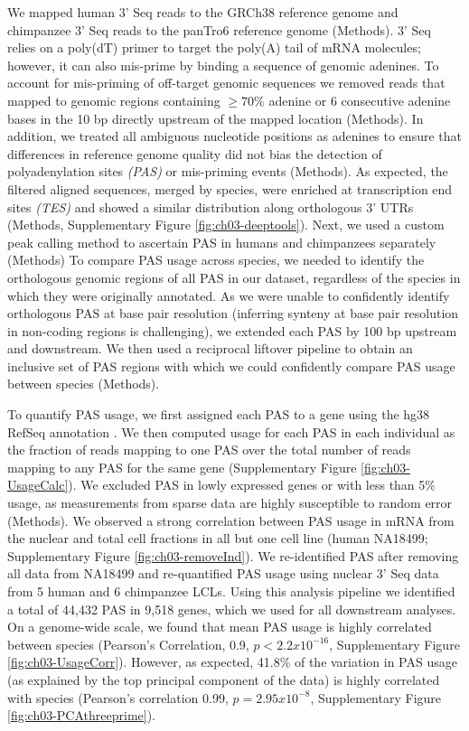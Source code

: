 We mapped human 3' Seq reads to the GRCh38 reference genome and chimpanzee 3' Seq reads to the panTro6 reference genome \citep{chimpanzee_sequencing_and_analysis_consortium_initial_2005, schneider_evaluation_2017}  (Methods). 3' Seq relies on a poly(dT) primer to target the poly(A) tail of mRNA molecules; however, it can also mis-prime by binding a sequence of genomic adenines. To account for mis-priming of off-target genomic sequences we removed reads that mapped to genomic regions containing $\geq70\%$ adenine or 6 consecutive adenine bases in the 10 bp directly upstream of the mapped location  \citep{mittleman_alternative_2020, sheppard_accurate_2013, tian_large-scale_2005} (Methods). In addition, we treated all ambiguous nucleotide positions as adenines to ensure that differences in reference genome quality did not bias the detection of polyadenylation sites \emph{(PAS)} or mis-priming events (Methods). As expected, the filtered aligned sequences, merged by species, were enriched at transcription end sites \emph{(TES)} and showed a similar distribution along orthologous 3' UTRs (Methods, Supplementary Figure \ref{fig:ch03-deeptools}). Next, we used a custom peak calling method to ascertain PAS in humans and chimpanzees separately (Methods) To compare PAS usage across species, we needed to identify the orthologous genomic regions of all PAS in our dataset, regardless of the species in which they were originally annotated. As we were unable to confidently identify orthologous PAS at base pair resolution (inferring synteny at base pair resolution in non-coding regions is challenging\citep{broad_institute_sequencing_platform_and_whole_genome_assembly_team_high-resolution_2011}),  we extended each PAS by 100 bp upstream and downstream. We then used a reciprocal liftover pipeline to obtain an inclusive set of PAS regions with which we could confidently compare PAS usage between species (Methods). 


To quantify PAS usage, we first assigned each PAS to a gene using the hg38 RefSeq annotation \citep{pruitt_ncbi_2005}. We then computed usage for each PAS in each individual as the fraction of reads mapping to one PAS over the total number of reads mapping to any PAS for the same gene (Supplementary Figure \ref{fig:ch03-UsageCalc}). We excluded PAS in lowly expressed genes or with less than 5\% usage, as measurements from sparse data are highly susceptible to random error (Methods). We observed a strong correlation between PAS usage in mRNA from the nuclear and total cell fractions in all but one cell line (human NA18499; Supplementary Figure \ref{fig:ch03-removeInd}). We re-identified PAS after removing all data from NA18499 and re-quantified PAS usage using nuclear 3' Seq data from 5 human and 6 chimpanzee LCLs. Using this analysis pipeline we identified a total of 44,432 PAS in 9,518 genes, which we used for all downstream analyses. On a genome-wide scale, we found that mean PAS usage is highly correlated between species (Pearson's Correlation, 0.9, $p<2.2x10^{-16}$, Supplementary Figure \ref{fig:ch03-UsageCorr}). However, as expected, 41.8\% of the variation in PAS usage (as explained by the top principal component of the data) is highly correlated with species (Pearson's correlation 0.99, $p =2.95x10^{-8}$, Supplementary Figure \ref{fig:ch03-PCAthreeprime}). 


